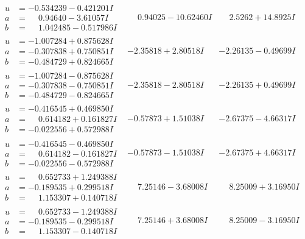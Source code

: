 \documentclass[1p]{elsarticle_modified}
\theoremstyle{definition}
\begin{document}
$$\begin{array}{c|c|c}
\begin{aligned}
u &= -0.534239 - 0.421201 I \\
a &= \phantom{-}0.94640 - 3.61057 I \\
b &= \phantom{-}1.042485 - 0.517986 I\end{aligned}
 & \phantom{-}0.94025 - 10.62460 I & \phantom{-}2.5262 + 14.8925 I \\ \hline\begin{aligned}
u &= -1.007284 + 0.875628 I \\
a &= -0.307838 + 0.750851 I \\
b &= -0.484729 + 0.824665 I\end{aligned}
 & -2.35818 + 2.80518 I & -2.26135 - 0.49699 I \\ \hline\begin{aligned}
u &= -1.007284 - 0.875628 I \\
a &= -0.307838 - 0.750851 I \\
b &= -0.484729 - 0.824665 I\end{aligned}
 & -2.35818 - 2.80518 I & -2.26135 + 0.49699 I \\ \hline\begin{aligned}
u &= -0.416545 + 0.469850 I \\
a &= \phantom{-}0.614182 + 0.161827 I \\
b &= -0.022556 + 0.572988 I\end{aligned}
 & -0.57873 + 1.51038 I & -2.67375 - 4.66317 I \\ \hline\begin{aligned}
u &= -0.416545 - 0.469850 I \\
a &= \phantom{-}0.614182 - 0.161827 I \\
b &= -0.022556 - 0.572988 I\end{aligned}
 & -0.57873 - 1.51038 I & -2.67375 + 4.66317 I \\ \hline\begin{aligned}
u &= \phantom{-}0.652733 + 1.249388 I \\
a &= -0.189535 + 0.299518 I \\
b &= \phantom{-}1.153307 + 0.140718 I\end{aligned}
 & \phantom{-}7.25146 - 3.68008 I & \phantom{-}8.25009 + 3.16950 I \\ \hline\begin{aligned}
u &= \phantom{-}0.652733 - 1.249388 I \\
a &= -0.189535 - 0.299518 I \\
b &= \phantom{-}1.153307 - 0.140718 I\end{aligned}
 & \phantom{-}7.25146 + 3.68008 I & \phantom{-}8.25009 - 3.16950 I \\ \hline\begin{aligned}

\end{aligned}
\end{array}$$
\end{document}
